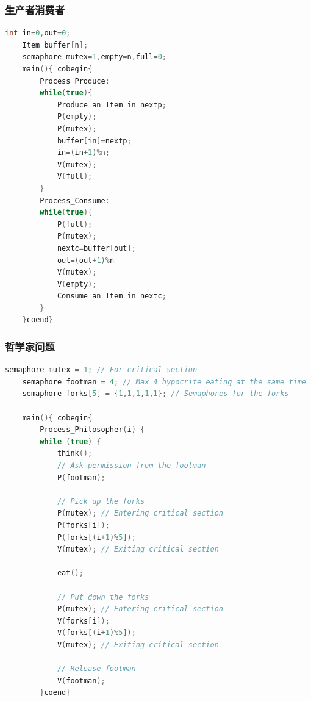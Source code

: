 \documentclass{article}
\begin{document}
\clearpage
\subsubsection{生产者消费者}
\begin{tcolorbox}
    [colback=Emerald!10,colframe=cyan!40!black,title=\textbf{伪代码}]
    \begin{lstlisting}[language=c]
    int in=0,out=0;
    Item buffer[n];
    semaphore mutex=1,empty=n,full=0;
    main(){ cobegin{ 
        Process_Produce: 
        while(true){
            Produce an Item in nextp;
            P(empty);
            P(mutex);
            buffer[in]=nextp;
            in=(in+1)%n;
            V(mutex);
            V(full);
        }
        Process_Consume:
        while(true){
            P(full);
            P(mutex);
            nextc=buffer[out];
            out=(out+1)%n
            V(mutex);
            V(empty);
            Consume an Item in nextc;
        }
    }coend}\end{lstlisting}
\end{tcolorbox}

\clearpage
\subsubsection{哲学家问题}
\begin{tcolorbox}
    [colback=Emerald!10,colframe=cyan!40!black,title=\textbf{伪代码}]
    \begin{lstlisting}[language=c]
    semaphore mutex = 1; // For critical section
    semaphore footman = 4; // Max 4 hypocrite eating at the same time
    semaphore forks[5] = {1,1,1,1,1}; // Semaphores for the forks

    main(){ cobegin{ 
        Process_Philosopher(i) {
        while (true) {
            think();
            // Ask permission from the footman
            P(footman);
    
            // Pick up the forks
            P(mutex); // Entering critical section
            P(forks[i]);
            P(forks[(i+1)%5]);
            V(mutex); // Exiting critical section
    
            eat();
    
            // Put down the forks
            P(mutex); // Entering critical section
            V(forks[i]);
            V(forks[(i+1)%5]);
            V(mutex); // Exiting critical section
    
            // Release footman
            V(footman);
        }coend}\end{lstlisting}
\end{tcolorbox}
\end{document}
